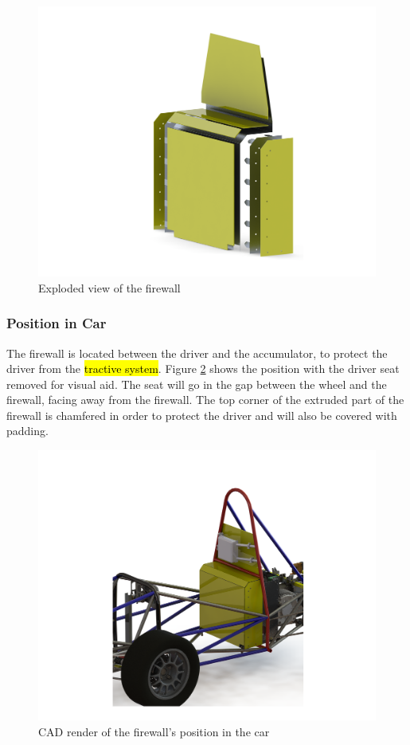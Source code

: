 \documentclass{article}
\DeclareRobustCommand{\hlr}[1]{{\sethlcolor{red}\hl{#1}}}
\begin{document}
            \begin{figure}[H]
                \centering
                \includegraphics[width = 0.6 \textwidth]{ExplodedView}
                \caption{Exploded view of the firewall}
                \label{explodedfirewall}
            \end{figure}

        \subsubsection{Position in Car}

            The firewall is located between the driver and the accumulator, to protect the driver from the \hlr{tractive system}. Figure \ref{firewallposition} shows the position with the driver seat removed for visual aid. The seat will go in the gap between the wheel and the firewall, facing away from the firewall. The top corner of the extruded part of the firewall is chamfered in order to protect the driver and will also be covered with padding.

            \begin{figure}[H]
                \centering
                \includegraphics[width = 0.8 \textwidth]{FirewallFullCarView}
                \caption{CAD render of the firewall's position in the car}
                \label{firewallposition}
            \end{figure}
\end{document}
